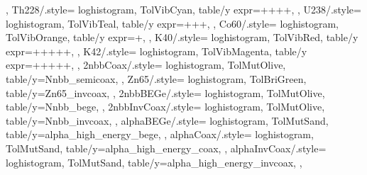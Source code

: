 {{  },
  Th228/.style={%
    loghistogram,
    TolVibCyan,
    table/y expr=++++,
  },
  U238/.style={%
    loghistogram,
    TolVibTeal,
    table/y expr=+++,
  },
  Co60/.style={%
    loghistogram,
    TolVibOrange,
    table/y expr=+,
  },
  K40/.style={%
    loghistogram,
    TolVibRed,
    table/y expr=+++++,
  },
  K42/.style={%
    loghistogram,
    TolVibMagenta,
    table/y expr=+++++,
  },
  2nbbCoax/.style={%
    loghistogram,
    TolMutOlive,
    table/y=Nnbb_semicoax,
  },
  Zn65/.style={%
    loghistogram,
    TolBriGreen,
    table/y=Zn65_invcoax,
  },
  2nbbBEGe/.style={%
    loghistogram,
    TolMutOlive,
    table/y=Nnbb_bege,
  },
  2nbbInvCoax/.style={%
    loghistogram,
    TolMutOlive,
    table/y=Nnbb_invcoax,
  },
  alphaBEGe/.style={%
    loghistogram,
    TolMutSand,
    table/y=alpha_high_energy_bege,
  },
  alphaCoax/.style={%
    loghistogram,
    TolMutSand,
    table/y=alpha_high_energy_coax,
  },
  alphaInvCoax/.style={%
    loghistogram,
    TolMutSand,
    table/y=alpha_high_energy_invcoax,
  },
}

\newcommand{\addbrasilianplot}{%
  \addplot[3sigu] table {\loadedtable};
  \addplot[3sigl] table {\loadedtable};
  \addplot[3sigb] fill between [of=3sigu and 3sigl];
  \addplot[2sigu] table {\loadedtable};
  \addplot[2sigl] table {\loadedtable};
  \addplot[2sigb] fill between [of=2sigu and 2sigl];
  \addplot[1sigu] table {\loadedtable};
  \addplot[1sigl] table {\loadedtable};
  \addplot[1sigb] fill between [of=1sigu and 1sigl];
  \addplot[ratio] table {\loadedtable};
}
